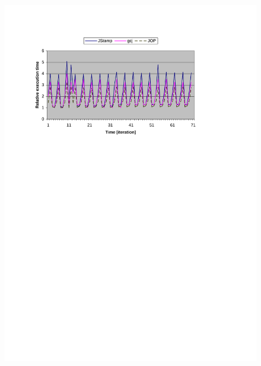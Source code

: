 \begin{figure}
    \centering
    \includegraphics[width=\excelwidth]{results/results_kfl_exe}
    \\
    \vspace{0.5cm}

\end{figure}
